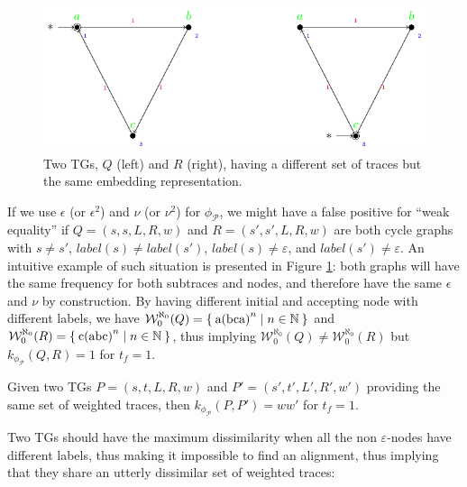 \begin{figure}[!t]
	\centering
	\includegraphics[scale=.7]{images/counterexample.pdf}
	\caption{Two TGs, $Q$ (left) and $R$ (right), having a different set of traces but the same embedding representation.}\label{fig:counterexample}
\end{figure}
\begin{example}
	If we use $\epsilon$ (or $\epsilon^2$) and $\nu$ (or $\nu^2$) for $\phi_{\mathcal{P}}$, we might have a false positive for ``weak equality'' if $Q=(s,s,L,R,w)$ and $R=(s',s',L,R,w)$ are both cycle graphs with $s\neq s'$, $\textit{label}(s)\neq\textit{label}(s')$, $\textit{label}(s)\neq\varepsilon$, and $\textit{label}(s')\neq\varepsilon$. An intuitive example of such situation is presented in Figure \ref{fig:counterexample}: both graphs will have the same frequency for both subtraces and nodes, and therefore have the same  $\epsilon$ and $\nu$ by construction. By having different initial and accepting node with  different labels, we have $\mathcal{W}_0^{\aleph_0}(Q)=\Set{\textup{a(bca)}^n|n\in\mathbb{N}}$ and $\mathcal{W}_0^{\aleph_0}(R)=\Set{\textup{c(abc)}^n|n\in\mathbb{N}}$, thus implying $\mathcal{W}_0^{\aleph_0}(Q)\neq\mathcal{W}_0^{\aleph_0}(R)$ but $k_{\phi_{\mathcal{P}}}(Q,R)=1$ for $t_f=1$.
\end{example}


\begin{lemma}
	Given two TGs $P=(s,t,L,R,w)$ and $P'=(s',t',L',R',w')$ providing the same set of weighted traces, then $k_{\phi_{\mathcal{P}}}(P,P')=ww'$ for $t_f=1$.
\end{lemma}

Two TGs should have the maximum dissimilarity when all the non $\varepsilon$-nodes have different labels, thus making it impossible to find an alignment, thus implying that they share an utterly dissimilar set of weighted traces:

